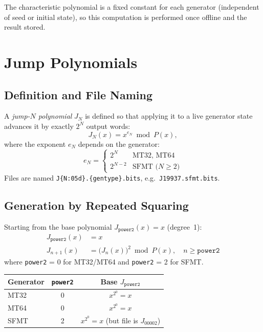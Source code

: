 \documentclass{article}
\begin{document}
The characteristic polynomial is a fixed constant for each generator (independent of seed
or initial state), so this computation is performed once offline and the result stored.

\section{Jump Polynomials}
\label{sec:jumppoly}

\subsection{Definition and File Naming}

A \emph{jump-$N$ polynomial} $J_N$ is defined so that applying it to a live generator
state advances it by exactly $2^N$ output words:
\begin{equation}
  J_N(x) = x^{e_N} \bmod P(x),
\end{equation}
where the exponent $e_N$ depends on the generator:
\begin{equation}
  e_N = \begin{cases} 2^N & \text{MT32, MT64} \\ 2^{N-2} & \text{SFMT ($N \geq 2$)} \end{cases}
\end{equation}
Files are named \texttt{J\{N:05d\}.\{gentype\}.bits}, e.g.\ \texttt{J19937.sfmt.bits}.

\subsection{Generation by Repeated Squaring}

Starting from the base polynomial $J_{\mathtt{power2}}(x) = x$ (degree~1):
\begin{align}
  J_{\mathtt{power2}}(x) &= x \\
  J_{n+1}(x) &= \bigl(J_n(x)\bigr)^2 \bmod P(x), \quad n \geq \mathtt{power2}
\end{align}
where \texttt{power2} = 0 for MT32/MT64 and \texttt{power2} = 2 for SFMT.

\begin{center}
\begin{tabular}{lcc}
\toprule
Generator & \texttt{power2} & Base $J_{\mathtt{power2}}$ \\
\midrule
MT32 & 0 & $x^{2^0} = x$  \\
MT64 & 0 & $x^{2^0} = x$  \\
SFMT & 2 & $x^{2^0} = x$ (but file is $J_{00002}$) \\
\bottomrule
\end{tabular}
\end{center}
\end{document}
